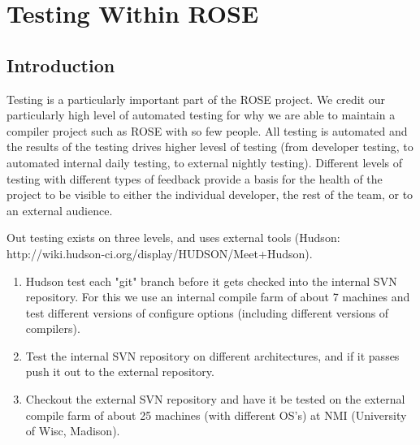 %
%

\chapter{Testing Within ROSE}
\label{testing::overviewOfTesting}

\section{Introduction}
   Testing is a particularly important part of the ROSE project.
We credit our particularly high level of automated testing for
why we are able to maintain a compiler project such as ROSE
with so few people.  All testing is automated and the results
of the testing drives higher levesl of testing (from
developer testing, to automated internal daily testing, to
external nightly testing).  Different levels of testing
with different types of feedback provide a basis for the health
of the project to be visible to either the individual developer,
the rest of the team, or to an external audience.

   Out testing exists on three levels, and uses external
tools (Hudson: http://wiki.hudson-ci.org/display/HUDSON/Meet+Hudson).
\begin{enumerate}
   \item Hudson test each "git" branch before it gets checked into the internal
     SVN repository. For this we use an internal compile farm of
     about 7 machines and test different versions of configure options
     (including different versions of compilers).
   \item Test the internal SVN repository on different architectures, and if it passes
     push it out to the external repository.
   \item  Checkout the external SVN repository and have it be tested on the
     external compile farm of about 25 machines (with different OS's) at
     NMI (University of Wisc, Madison).
\end{enumerate}

